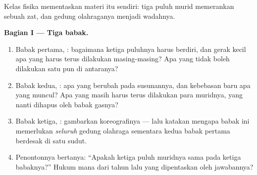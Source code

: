 \begin{problem}\label{pb:g7:states-of-matter:1}
Kelas fisika mementaskan materi itu sendiri: tiga puluh murid
memerankan  sebuah zat, dan gedung olahraganya menjadi
wadahnya.

\medskip\noindent\textbf{Bagian I --- Tiga babak.}
\begin{enumerate}
  \item Babak pertama, : bagaimana ketiga puluhnya harus
        berdiri, dan gerak kecil apa yang harus terus dilakukan
        masing-masing? Apa yang tidak boleh dilakukan satu pun di
        antaranya?
  \item Babak kedua, : apa yang berubah pada susunannya, dan
        kebebasan baru apa yang muncul? Apa yang masih harus terus
        dilakukan para muridnya, yang nanti dihapus oleh babak
        gasnya?
  \item Babak ketiga, : gambarkan koreografinya --- lalu katakan
        mengapa babak ini memerlukan \emph{seluruh} gedung olahraga
        sementara kedua babak pertama berdesak di satu sudut.
  \item Penontonnya bertanya: ``Apakah ketiga puluh muridnya sama
        pada ketiga babaknya?'' Hukum mana dari tahun lalu yang
        dipentaskan oleh jawabannya?
\end{enumerate}


\end{problem}
